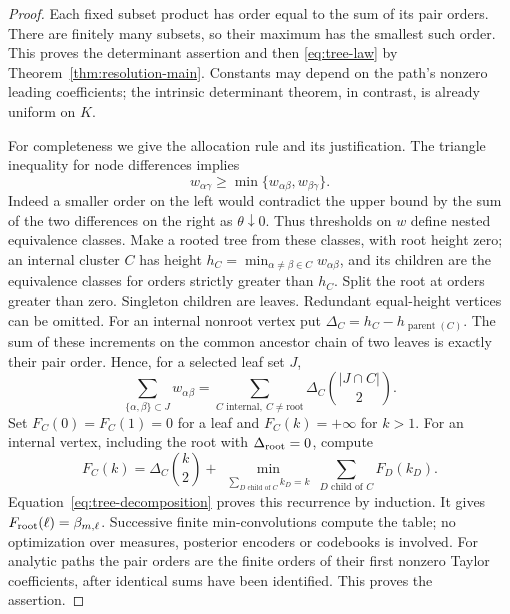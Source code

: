 \begin{proof}
Each fixed subset product has order equal to the sum of its pair orders.
There are finitely many subsets, so their maximum has the smallest such
order. This proves the determinant assertion and then
\eqref{eq:tree-law} by Theorem~\ref{thm:resolution-main}.
Constants may depend on the path's
nonzero leading coefficients; the intrinsic determinant theorem, in
contrast, is already uniform on $K$.

For completeness we give the allocation rule and its justification. The
triangle inequality for node differences implies
\[
 w_{\alpha\gamma}\ge
       \min\{w_{\alpha\beta},w_{\beta\gamma}\}.
\]
Indeed a smaller order on the left would contradict the upper bound by
the sum of the two differences on the right as $\theta\downarrow0$.
Thus thresholds on $w$ define nested equivalence classes. Make a rooted
tree from these classes, with root height zero; an internal cluster $C$
has height $h_C=\min_{\alpha\ne\beta\in C}w_{\alpha\beta}$,
and its children are the equivalence classes for orders strictly greater
than $h_C$. Split the root at orders greater than zero. Singleton
children are leaves. Redundant equal-height vertices can be omitted.
For an internal nonroot vertex put
$\Delta_C=h_C-h_{\operatorname{parent}(C)}$. The sum of these increments
on the common ancestor chain of two leaves is exactly their pair order.
Hence, for a selected leaf set $J$,
\begin{equation}\label{eq:tree-decomposition}
 \sum_{\{\alpha,\beta\}\subset J}w_{\alpha\beta}
   =\sum_{C\text{ internal},\ C\ne\mathrm{root}}
               \Delta_C\binom{|J\cap C|}{2}.
\end{equation}
Set $F_C(0)=F_C(1)=0$ for a leaf and $F_C(k)=+\infty$ for $k>1$.
For an internal vertex, including the root with $\Delta_{\rm root}=0$,
compute
\begin{equation}\label{eq:tree-dp}
 F_C(k)=\Delta_C\binom{k}{2}+
   \min_{\substack{\sum_{D\text{ child of }C}k_D=k}}
                 \sum_{D\text{ child of }C}F_D(k_D).
\end{equation}
Equation~\eqref{eq:tree-decomposition} proves this recurrence by induction.
It gives $F_{\rm root}(\ell)=\beta_{m,\ell}$. Successive finite
min-convolutions compute the table; no optimization over measures,
posterior encoders or codebooks is involved. For analytic paths the pair
orders are the finite orders of their first nonzero Taylor coefficients,
after identical sums have been identified. This proves the assertion.
\end{proof}

